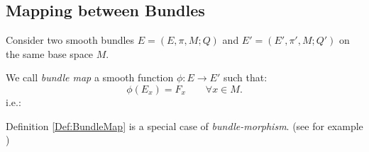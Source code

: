 \documentclass[Main]{subfiles}
\begin{document}
			
			
		\subsection{Mapping between Bundles}
			Consider two smooth bundles $E=(E,\pi,M; Q)$ and $E'=(E',\pi',M; Q')$ on the same base space $M$.
			\begin{definition}\label{Def:BundleMap}
				We call \emph{bundle map} a smooth function $\phi: E \rightarrow E'$ such that:			
			 	\begin{displaymath}
			 		\phi(E_{x})= F_{x} \qquad \forall x \in M.
			 	\end{displaymath}
				i.e.:
				
				\centering
			\end{definition}
				Definition \ref{Def:BundleMap} is a special case of \emph{bundle-morphism}. (see for example \cite{G.Sardanashvily2013})
\end{document}
